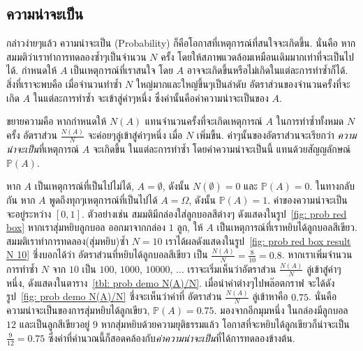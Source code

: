 \subsection{ความน่าจะเป็น}
\label{sec: probability main}

กล่าวง่ายๆแล้ว ความน่าจะเป็น (Probability) ก็คือโอกาสที่เหตุการณ์ที่สนใจจะเกิดขึ้น.
นั่นคือ หากสมมติว่าเราทำการทดลองซ้ำๆเป็นจำนวน $N$ ครั้ง 
โดยให้สภาพแวดล้อมเหมือนเดิมมากเท่าที่จะเป็นไปได้.
กำหนดให้ $A$ เป็นเหตุการณ์ที่เราสนใจ 
โดย $A$ อาจจะเกิดขึ้นหรือไม่เกิดในแต่ละการทำซ้ำก็ได้.
สิ่งที่เราจะพบคือ
เมื่อจำนวนทำซ้ำ $N$ ใหญ่มากและใหญ่ขึ้นๆเป็นลำดับ
อัตราส่วนของจำนวนครั้งที่จะเกิด $A$ ในแต่ละการทำซ้ำ จะเข้าสู่ค่าๆหนึ่ง ซึ่งค่านั้นคือค่าความน่าจะเป็นของ $A$.

ขยายความคือ
หากกำหนดให้ $N(A)$ แทนจำนวนครั้งที่จะเกิดเหตุการณ์ $A$ ในการทำซ้ำทั้งหมด $N$ ครั้ง
อัตราส่วน $\frac{N(A)}{N}$ จะค่อยๆลู่เข้าสู่ค่าๆหนึ่ง เมื่อ $N$ เพิ่มขึ้น.
ค่าๆนั้นของอัตราส่วนจะเรียกว่า \textit{ความน่าจะเป็น}ที่เหตุการณ์ $A$ จะเกิดขึ้น ในแต่ละการทำซ้ำ
โดยค่าความน่าจะเป็นนี้ แทนด้วยสัญญลักษณ์ $\mathbb{P}(A)$.


หาก $A$ เป็นเหตุการณ์ที่เป็นไปไม่ได้, $A = \emptyset$, ดังนั้น $N(\emptyset) = 0$ และ $\mathbb{P}(A) = 0$.
ในทางกลับกัน หาก $A$ พูดถึงทุกๆเหตุการณ์ที่เป็นไปได้ $A = \Omega$, ดังนั้น $\mathbb{P}(A) = 1$.
ค่าของความน่าจะเป็น จะอยู่ระหว่าง $[0,1]$.
ตัวอย่างเช่น สมมติมีกล่องใส่ลูกบอลสีต่างๆ ดังแสดงในรูป~\ref{fig: prob red box} หากเราสุ่มหยิบลูกบอล ออกมาจากกล่อง $1$ ลูก,
ให้ $A$ เป็นเหตุการณ์ที่เราหยิบได้ลูกบอลสีเขียว.
สมมติเราทำการทดลอง(สุ่มหยิบ)ซ้ำ $N = 10$ เราได้ผลดังแสดงในรูป~\ref{fig: prob red box result N 10}
ซึ่งบอกได้ว่า อัตราส่วนที่หยิบได้ลูกบอลสีเขียว เป็น $\frac{N(A)}{N} = \frac{8}{10} = 0.8$.
หากเราเพิ่มจำนวนการทำซ้ำ $N$ จาก $10$ เป็น $100$, $1000$, $10000$, ...
เราจะเริ่มเห็นว่าอัตราส่วน $\frac{N(A)}{N}$ ลู่เข้าสู่ค่าๆหนึ่ง, ดังแสดงในตาราง~\ref{tbl: prob demo N(A)/N}.
เมื่อนำค่าต่างๆไปพล๊อตกราฟ จะได้ดังรูป~\ref{fig: prob demo N(A)/N} ซึ่งจะเห็นว่าค่าที่ อัตราส่วน $\frac{N(A)}{N}$ ลู่เข้าหาคือ $0.75$.
นั่นคือ ความน่าจะเป็นของการสุ่มหยิบได้ลูกเขียว, $\mathbb{P}(A) = 0.75$.
มองจากอีกมุมหนึ่ง ในกล่องมีลูกบอล $12$ และเป็นลูกสีเขียวอยู่ $9$ หากสุ่มหยิบด้วยความยุติธรรมแล้ว โอกาสที่จะหยิบได้ลูกเขียวก็น่าจะเป็น $\frac{9}{12} = 0.75$
ซึ่งค่าที่คำนวณนี้ก็สอดคล้องกับ\textit{ค่าความน่าจะเป็น}ที่ได้การทดลองข้างต้น.

